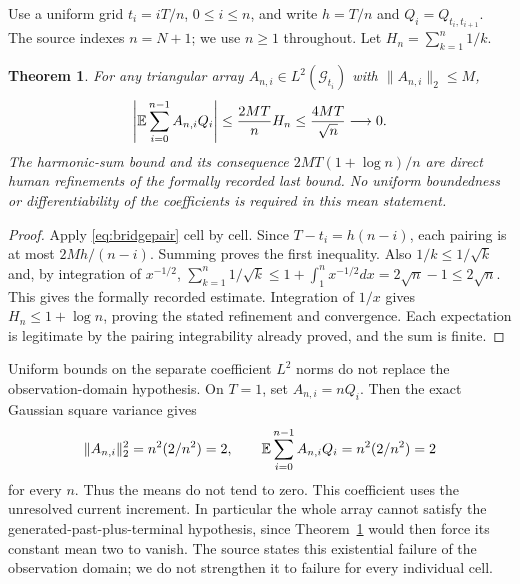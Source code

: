 \documentclass[11pt]{article}
\newtheorem{theorem}{Theorem}[section]
\begin{document}
Use a uniform grid $t_i=iT/n$, $0\le i\le n$, and write
$h=T/n$ and $Q_i=Q_{t_i,t_{i+1}}$. The source indexes $n=N+1$;
we use $n\ge1$ throughout. Let $H_n=\sum_{k=1}^n1/k$.
\begin{theorem}\label{thm:bracketmean}
For any triangular array $A_{n,i}\in L^2(\mathcal G_{t_i})$ with
$\|A_{n,i}\|_2\le M$,
\begin{equation}\label{eq:bracketmean}
 \left|\mathbb E\sum_{i=0}^{n-1} A_{n,i}Q_i\right|
 \le\frac{2MT}{n}H_n\le\frac{4MT}{\sqrt n}\longrightarrow0.
\end{equation}
The harmonic-sum bound and its consequence
$2MT(1+\log n)/n$ are direct human refinements of the formally recorded
last bound. No uniform boundedness or differentiability of the
coefficients is required in this mean statement.
\end{theorem}
\begin{proof}
Apply \eqref{eq:bridgepair} cell by cell. Since
$T-t_i=h(n-i)$, each pairing is at most
$2Mh/(n-i)$. Summing proves the first inequality. Also
$1/k\le1/\sqrt k$ and, by integration of $x^{-1/2}$,
$\sum_{k=1}^n1/\sqrt k\le1+\int_1^n x^{-1/2}dx
=2\sqrt n-1\le2\sqrt n$.
This gives the formally recorded estimate. Integration of $1/x$ gives
$H_n\le1+\log n$, proving the stated refinement and convergence.
Each expectation is legitimate by the pairing integrability already
proved, and the sum is finite.
\end{proof}

Uniform bounds on the separate coefficient $L^2$ norms do not replace
the observation-domain hypothesis. On $T=1$, set
$A_{n,i}=nQ_i$. Then the exact Gaussian square variance gives
\[
 \|A_{n,i}\|_2^2=n^2(2/n^2)=2,\qquad
 \mathbb E\sum_{i=0}^{n-1}A_{n,i}Q_i=n^2(2/n^2)=2
\]
for every $n$. Thus the means do not tend to zero. This coefficient
uses the unresolved current increment. In particular the whole array
cannot satisfy the generated-past-plus-terminal hypothesis, since
Theorem~\ref{thm:bracketmean} would then force its constant mean two to
vanish. The source states this existential failure of the observation
domain; we do not strengthen it to failure for every individual cell.
\end{document}
